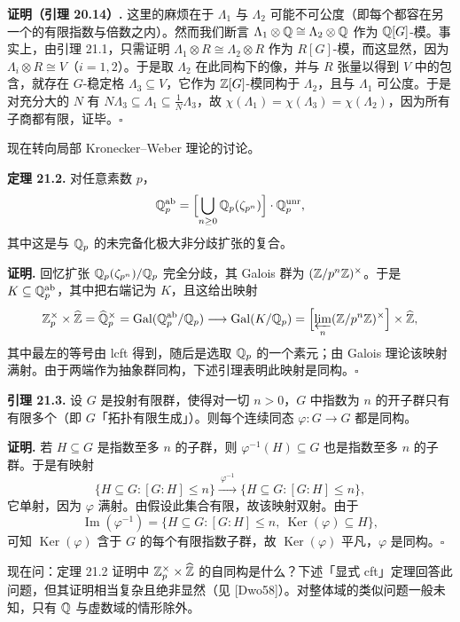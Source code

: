 \textbf{证明（引理 20.14）.} 这里的麻烦在于 $\Lambda_1$ 与 $\Lambda_2$ 可能不可公度（即每个都容在另一个的有限指数与倍数之内）。然而我们断言 $\Lambda_1\otimes\mathbb{Q}\cong\Lambda_2\otimes\mathbb{Q}$ 作为 $\mathbb{Q}[G]$-模。事实上，由引理 21.1，只需证明 $\Lambda_1\otimes R\cong\Lambda_2\otimes R$ 作为 $R[G]$-模，而这显然，因为 $\Lambda_i\otimes R\cong V$（$i=1,2$）。于是取 $\Lambda_2$ 在此同构下的像，并与 $R$ 张量以得到 $V$ 中的包含，就存在 $G$-稳定格 $\Lambda_3\subseteq V$，它作为 $\mathbb{Z}[G]$-模同构于 $\Lambda_2$，且与 $\Lambda_1$ 可公度。于是对充分大的 $N$ 有 $N\Lambda_3\subseteq\Lambda_1\subseteq\frac1N\Lambda_3$，故 $\chi(\Lambda_1)=\chi(\Lambda_3)=\chi(\Lambda_2)$，因为所有子商都有限，证毕。\hfill$\square$

现在转向局部 Kronecker--Weber 理论的讨论。

\textbf{定理 21.2.} 对任意素数 $p$，
\[
\mathbb{Q}_p^{\mathrm{ab}}=\Bigl[\bigcup_{n\ge0}\mathbb{Q}_p(\zeta_{p^n})\Bigr]\cdot\mathbb{Q}_p^{\mathrm{unr}},
\]
其中这是与 $\mathbb{Q}_p$ 的未完备化极大非分歧扩张的复合。

\textbf{证明.} 回忆扩张 $\mathbb{Q}_p(\zeta_{p^n})/\mathbb{Q}_p$ 完全分歧，其 Galois 群为 $(\mathbb{Z}/p^n\mathbb{Z})^\times$。于是 $K\subseteq\mathbb{Q}_p^{\mathrm{ab}}$，其中把右端记为 $K$，且这给出映射
\[
\mathbb{Z}_p^\times\times\widehat{\mathbb{Z}}=\widehat{\mathbb{Q}}_p^{\times}=\operatorname{Gal}(\mathbb{Q}_p^{\mathrm{ab}}/\mathbb{Q}_p)\longrightarrow\operatorname{Gal}(K/\mathbb{Q}_p)=\Bigl[\varprojlim_n(\mathbb{Z}/p^n\mathbb{Z})^\times\Bigr]\times\widehat{\mathbb{Z}},
\]
其中最左的等号由 lcft 得到，随后是选取 $\mathbb{Q}_p$ 的一个素元；由 Galois 理论该映射满射。由于两端作为抽象群同构，下述引理表明此映射是同构。\hfill$\square$

\textbf{引理 21.3.} 设 $G$ 是投射有限群，使得对一切 $n>0$，$G$ 中指数为 $n$ 的开子群只有有限多个（即 $G$「拓扑有限生成」）。则每个连续同态 $\varphi:G\to G$ 都是同构。

\textbf{证明.} 若 $H\subseteq G$ 是指数至多 $n$ 的子群，则 $\varphi^{-1}(H)\subseteq G$ 也是指数至多 $n$ 的子群。于是有映射
\[
\{H\subseteq G:[G:H]\le n\}\xrightarrow{\ \varphi^{-1}\ }\{H\subseteq G:[G:H]\le n\},
\]
它单射，因为 $\varphi$ 满射。由假设此集合有限，故该映射双射。由于
\[
\operatorname{Im}(\varphi^{-1})=\{H\subseteq G:[G:H]\le n,\ \operatorname{Ker}(\varphi)\subseteq H\},
\]
可知 $\operatorname{Ker}(\varphi)$ 含于 $G$ 的每个有限指数子群，故 $\operatorname{Ker}(\varphi)$ 平凡，$\varphi$ 是同构。\hfill$\square$

现在问：定理 21.2 证明中 $\mathbb{Z}_p^\times\times\widehat{\mathbb{Z}}$ 的自同构是什么？下述「显式 cft」定理回答此问题，但其证明相当复杂且绝非显然（见 [Dwo58]）。对整体域的类似问题一般未知，只有 $\mathbb{Q}$ 与虚数域的情形除外。

